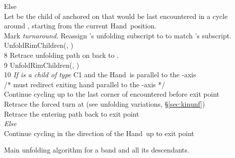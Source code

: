 \documentclass[11pt]{article}
\newcommand\hand{{\sc Hand}}
\newcommand\unfoldrim{{\sc UnfoldRimChildren}}
\begin{document}
\begin{table}[p]
\begin{center}
{\begin{minipage}[h]{0.9\linewidth}
{\begin{tabbing}
  \>   \> Else \\
  \> \> \> Let  be the child of  anchored on  that would be last encountered in a cycle \\
  \> \> \> \> around , starting from the current \hand\ position. \\
  \> \> \> Mark  \emph{turnaround}. Reassign 's unfolding subscript to  to match 's subscript. \\
  \> \> \> \unfoldrim(, ) \\
8 \>   \> Retrace unfolding path on  back to . \\
9 \>   \> \unfoldrim(, ) \\
10 \> \emph{If  is a child of type} C1 and the \hand\ is parallel to the -axis \\
\> \> /* must redirect exiting hand parallel to the -axis */ \\
   \> \> Continue cycling up to the last corner  of  encountered before exit point  \\
   \> \> Retrace the forced turn at  (see unfolding variations, \S\ref{sec:kinunf})\\
   \> \> Retrace the entering path back to exit point  \\
 \> \emph{Else} \\
   \> \> Continue cycling in the direction of the \hand\ up to exit point  
\end{tabbing}}
\end{minipage}
}\vspace{1mm}
\end{center}
\vspace{-1em}\caption{Main unfolding algorithm for a band and all its descendants.}
\label{tab:unfoldrims}
\end{table}
\end{document}
